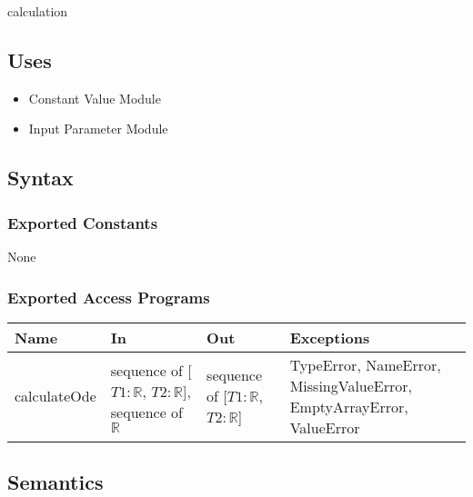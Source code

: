 \documentclass[12pt, titlepage]{article}
\begin{document}
calculation

\subsection{Uses}

\begin{itemize}
    \item Constant Value Module 
    \item Input Parameter Module
\end{itemize}

\subsection{Syntax}

\subsubsection{Exported Constants}
None

\subsubsection{Exported Access Programs}

\begin{tabular}{p{3cm} p{5cm} p{4cm} p{2.5cm}}
\hline
\textbf{Name} & \textbf{In} & \textbf{Out} & \textbf{Exceptions} \\
\hline
calculateOde & sequence of [$T1: \mathbb{R}$, $T2: \mathbb{R}$], sequence of $\mathbb{R}$ & sequence of [$T1: \mathbb{R}$, $T2: \mathbb{R}$] & TypeError, NameError, MissingValueError, EmptyArrayError, ValueError \\
\hline
\end{tabular}

\subsection{Semantics}
\end{document}
